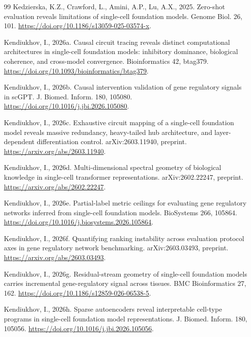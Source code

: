 \documentclass[review,authoryear,12pt]{elsarticle}
\begin{document}
\begin{thebibliography}{99}
 Kedzierska, K.Z., Crawford, L., Amini, A.P., Lu, A.X., 2025. Zero-shot evaluation reveals limitations of single-cell foundation models. Genome Biol. 26, 101. \url{https://doi.org/10.1186/s13059-025-03574-x}.

 Kendiukhov, I., 2026a. Causal circuit tracing reveals distinct computational architectures in single-cell foundation models: inhibitory dominance, biological coherence, and cross-model convergence. Bioinformatics 42, btag379. \url{https://doi.org/10.1093/bioinformatics/btag379}.

 Kendiukhov, I., 2026b. Causal intervention validation of gene regulatory signals in scGPT. J. Biomed. Inform. 180, 105080. \url{https://doi.org/10.1016/j.jbi.2026.105080}.

 Kendiukhov, I., 2026c. Exhaustive circuit mapping of a single-cell foundation model reveals massive redundancy, heavy-tailed hub architecture, and layer-dependent differentiation control. arXiv:2603.11940, preprint. \url{https://arxiv.org/abs/2603.11940}.

 Kendiukhov, I., 2026d. Multi-dimensional spectral geometry of biological knowledge in single-cell transformer representations. arXiv:2602.22247, preprint. \url{https://arxiv.org/abs/2602.22247}.

 Kendiukhov, I., 2026e. Partial-label metric ceilings for evaluating gene regulatory networks inferred from single-cell foundation models. BioSystems 266, 105864. \url{https://doi.org/10.1016/j.biosystems.2026.105864}.

 Kendiukhov, I., 2026f. Quantifying ranking instability across evaluation protocol axes in gene regulatory network benchmarking. arXiv:2603.03493, preprint. \url{https://arxiv.org/abs/2603.03493}.

 Kendiukhov, I., 2026g. Residual-stream geometry of single-cell foundation models carries incremental gene-regulatory signal across tissues. BMC Bioinformatics 27, 162. \url{https://doi.org/10.1186/s12859-026-06538-5}.

 Kendiukhov, I., 2026h. Sparse autoencoders reveal interpretable cell-type programs in single-cell foundation model representations. J. Biomed. Inform. 180, 105056. \url{https://doi.org/10.1016/j.jbi.2026.105056}.


\end{thebibliography}
\end{document}

